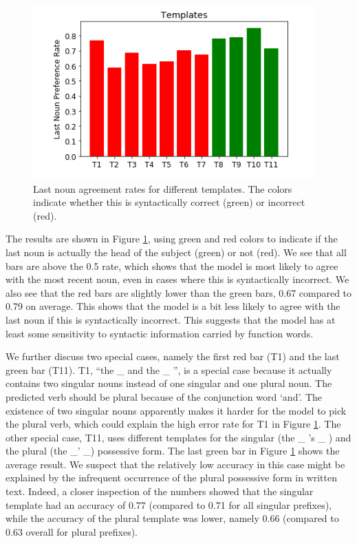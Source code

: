 \begin{figure}
    \centering
\includegraphics[scale=0.5]{screenshot-syntactic-templates} 
\caption{Last noun agreement rates for different templates.
The colors indicate whether this is syntactically correct (green)
or incorrect (red).
}
\label{fig:last_noun_rates}
\end{figure}


The results are shown in Figure \ref{fig:last_noun_rates},
using green and red colors to indicate if 
the last noun is actually the head of the subject (green)
or not (red). 
%
We see that all bars are above the 0.5 rate,
which shows that the model is most
likely to agree with the most recent noun,
even in cases where this is syntactically incorrect. 
%
We also see that the red bars are slightly
lower than the green bars,
0.67 compared to 0.79 on average.
This shows that the model is a bit less likely
to agree with the last noun if this is
syntactically incorrect.
This suggests that the model has 
at least some sensitivity
to syntactic information carried by function words.
%

%
We further discuss two special cases,
namely the first red bar (T1) and 
the last green bar (T11).
T1, ``the \_ and the \_ '', is a special case because it 
actually contains two singular nouns
instead of one singular and one plural noun. 
The predicted verb should be plural because of the
conjunction word `and'.
The existence of two singular nouns 
apparently makes it harder for the model
to pick the plural verb,
which could explain the high error rate
for T1 in Figure \ref{fig:last_noun_rates}.
%
The other special case, T11, uses different templates for the singular 
(the \_ 's \_ ) and the plural (the \_' \_) possessive form.
The last green bar in Figure \ref{fig:last_noun_rates} shows the average result.
We suspect that the relatively low accuracy
in this case might be explained by the infrequent
occurrence of the plural possessive form in written text.
Indeed, a closer inspection of the numbers showed that
the singular template had an accuracy
of 0.77 (compared to 0.71 for all singular prefixes), 
while the accuracy of the plural template
was lower, namely 0.66 (compared to 0.63 overall for plural prefixes).
%

